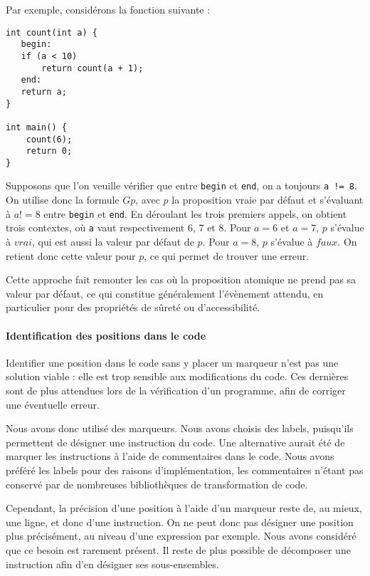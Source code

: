 Par exemple, considérons la fonction suivante :

\begin{lstlisting}
int count(int a) {
   begin:
   if (a < 10)
       return count(a + 1);
   end:
   return a;
}

int main() {
    count(6);
    return 0;
}
\end{lstlisting}

Supposons que l'on veuille vérifier que entre \texttt{begin} et
\texttt{end}, on a toujours \lstinline"a != 8". On utilise donc la
formule \(G p\), avec \(p\) la proposition vraie par défaut et
s'évaluant à \(a != 8\) entre \texttt{begin} et \texttt{end}. En
déroulant les trois premiers appels, on obtient trois contextes, où
\texttt{a} vaut respectivement 6, 7 et 8. Pour \(a = 6\) et
\(a = 7\), \(p\) s'évalue à \(vrai\), qui est aussi la valeur par défaut
de \(p\). Pour \(a = 8\), \(p\) s'évalue à \(faux\). On retient donc
cette valeur pour \(p\), ce qui permet de trouver une erreur.

Cette approche fait remonter les cas où la proposition atomique ne prend
pas sa valeur par défaut, ce qui constitue généralement l'évènement
attendu, en particulier pour des propriétés de sûreté ou
d'accessibilité.

\paragraph{Identification des positions dans le code}

Identifier une position dans le code sans y placer un marqueur n'est pas
une solution viable : elle est trop sensible aux modifications du code.
Ces dernières sont de plus attendues lors de la vérification d'un
programme, afin de corriger une éventuelle erreur.

Nous avons donc utilisé des marqueurs. Nous avons choisis des labels,
puisqu'ils permettent de désigner une instruction du code. Une
alternative aurait été de marquer les instructions à l'aide de
commentaires dans le code. Nous avons préféré les labels pour des
raisons d'implémentation, les commentaires n'étant pas conservé par de
nombreuses bibliothèques de transformation de code.

Cependant, la précision d'une position à l'aide d'un marqueur reste de,
au mieux, une ligne, et donc d'une instruction. On ne peut donc pas
désigner une position plus précisément, au niveau d'une expression par
exemple. Nous avons considéré que ce besoin est rarement présent. Il
reste de plus possible de décomposer une instruction afin d'en désigner
ses sous-ensembles.


